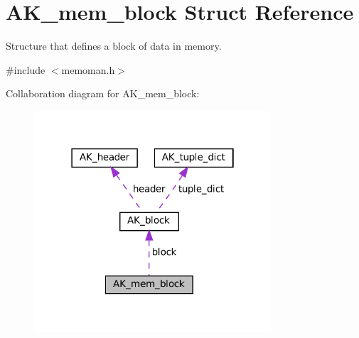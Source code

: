 \hypertarget{structAK__mem__block}{}\section{A\+K\+\_\+mem\+\_\+block Struct Reference}
\label{structAK__mem__block}


Structure that defines a block of data in memory.  




{\ttfamily \#include $<$memoman.\+h$>$}



Collaboration diagram for A\+K\+\_\+mem\+\_\+block\+:\nopagebreak
\begin{figure}[H]
\begin{center}
\leavevmode
\includegraphics[width=250pt]{structAK__mem__block__coll__graph}
\end{center}
\end{figure}

